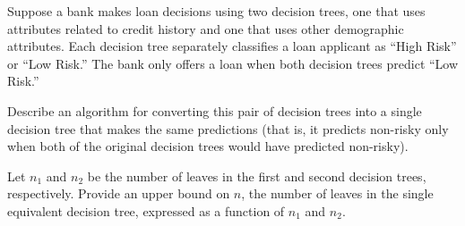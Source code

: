\begin{problem}
  Suppose a bank makes loan decisions using two decision trees, one that uses attributes related to credit history and one that uses other demographic attributes. Each decision tree separately classifies a loan applicant as “High Risk” or “Low Risk.” The bank only offers a loan when both decision trees predict “Low Risk.”
\end{problem}

\begin{subproblem}
  Describe an algorithm for converting this pair of decision trees into a single decision tree that makes the same predictions (that is, it predicts non-risky only when both of the original decision trees would have predicted non-risky).
\end{subproblem}

\begin{subproblem}
  Let $n_1$ and $n_2$ be the number of leaves in the first and second decision trees, respectively. Provide an upper bound on $n$, the number of leaves in the single equivalent decision tree, expressed as a function of $n_1$ and $n_2$.
\end{subproblem}

